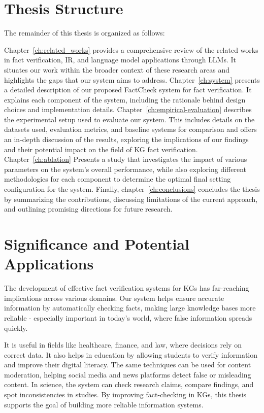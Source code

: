 \section{Thesis Structure}\label{sec:structure}
The remainder of this thesis is organized as follows:

Chapter~\ref{ch:related_works} provides a comprehensive review of the related works in fact verification, \ac{IR}, and language model applications through \ac{LLMs}.
It situates our work within the broader context of these research areas and highlights the gaps that our system aims to address.
Chapter~\ref{ch:system} presents a detailed description of our proposed FactCheck system for fact verification.
It explains each component of the system, including the rationale behind design choices and implementation details.
Chapter~\ref{ch:empirical-evaluation} describes the experimental setup used to evaluate our system.
This includes details on the datasets used, evaluation metrics, and baseline systems for comparison and offers an in-depth discussion of the results, exploring the implications of our findings and their potential impact on the field of \ac{KG} fact verification.
Chapter~\ref{ch:ablation} Presents a study that investigates the impact of various parameters on the system's overall performance, while also exploring different methodologies for each component to determine the optimal final setting configuration for the system.
Finally, chapter~\ref{ch:conclusions} concludes the thesis by summarizing the contributions, discussing limitations of the current approach, and outlining promising directions for future research.

\section{Significance and Potential Applications}\label{sec:significance}
The development of effective fact verification systems for \acp{KG} has far-reaching implications across various domains.
Our system helps ensure accurate information by automatically checking facts, making large knowledge bases more reliable - especially important in today's world, where false information spreads quickly.

It is useful in fields like healthcare, finance, and law, where decisions rely on correct data.
It also helps in education by allowing students to verify information and improve their digital literacy.
The same techniques can be used for content moderation, helping social media and news platforms detect false or misleading content.
In science, the system can check research claims, compare findings, and spot inconsistencies in studies.
By improving fact-checking in \acp{KG}, this thesis supports the goal of building more reliable information systems.